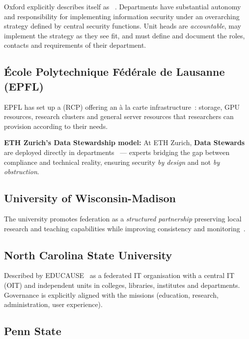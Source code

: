 Oxford explicitly describes itself as ~\cite{oxford-infosec}.
Departments have substantial autonomy and responsibility for implementing
information security under an overarching strategy defined by central
security functions. Unit heads are \emph{accountable}, may implement the
strategy as they see fit, and must define and document the
  roles, contacts and requirements of their department.

\subsection{École Polytechnique Fédérale de Lausanne (EPFL)}

EPFL has set up a  (RCP)
offering an à la carte infrastructure~\cite{epfl-rcp}: storage,
GPU resources, research clusters and general server resources that
researchers can provision according to their needs.

\medskip
\noindent\textbf{ETH Zurich's Data Stewardship model:}
At ETH Zurich, \textbf{Data Stewards} are deployed directly in
departments~\cite{eth-data-stewardship} --- experts bridging the gap
between compliance and technical reality, ensuring security
\emph{by design} and not \emph{by obstruction}.

\subsection{University of Wisconsin-Madison}

The university promotes federation as a \emph{structured
partnership} preserving local research and teaching capabilities
while improving consistency and
monitoring~\cite{uw-madison}.

\subsection{North Carolina State University}

Described by EDUCAUSE~\cite{ncsu-governance} as a federated IT
organisation with a central IT (OIT) and independent units in
colleges, libraries, institutes and departments. Governance is
explicitly aligned with the missions (education, research,
administration, user experience).

\subsection{Penn State}

